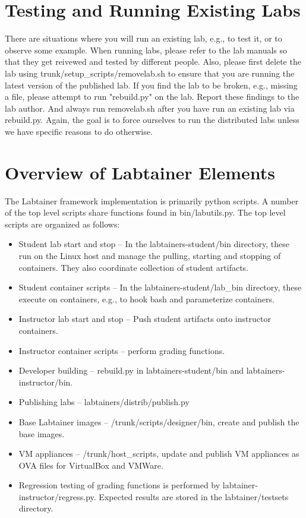 \documentclass[12pt]{article}
\begin{document}
\section{Testing and Running Existing Labs}
There are situations where you will run an existing lab, e.g., to test it, or to 
observe some example.  When running labs, please refer to the lab manuals
so that they get reivewed and tested by different people.  Also, please first delete
the lab using trunk/setup\_scripts/removelab.sh to ensure that you are running the latest
version of the published lab.  If you find the lab to be broken, e.g., missing a file, please
attempt to run "rebuild.py" on the lab.  Report these findings to the lab author.  And always
run removelab.sh after you have run an existing lab via rebuild.py.  Again, the goal is to
force ourselves to run the distributed labs unless we have specific reasons to do otherwise.

\section{Overview of Labtainer Elements}
The Labtainer framework implementation is primarily python scripts.  A number of the 
top level scripts share functions found in bin/labutils.py.  The 
top level scripts are organized as follows:

\begin{itemize}
\item Student lab start and stop -- In the labtainers-student/bin directory, these run on the 
Linux host and manage the pulling, starting and stopping of containers.  They also coordinate
collection of student artifacts.
\item Student container scripts -- In the labtainers-student/lab\_bin directory, these execute on
containers, e.g., to hook bash and parameterize containers.
\item Instructor lab start and stop -- Push student artifacts onto instructor containers.
\item Instructor container scripts -- perform grading functions.
\item Developer building -- rebuild.py in labtainers-student/bin and labtainers-instructor/bin.
\item Publishing labs -- labtainers/distrib/publish.py
\item Base Labtainer images -- /trunk/scripts/designer/bin, create and publish the base images.
\item VM appliances -- /trunk/host\_scripts, update and publish VM appliances as OVA files for 
VirtualBox and VMWare.
\item Regression testing of grading functions is performed by labtainer-instructor/regress.py.
Expected results are stored in the labtainer/testsets directory.
\end{itemize}
\end{document}
